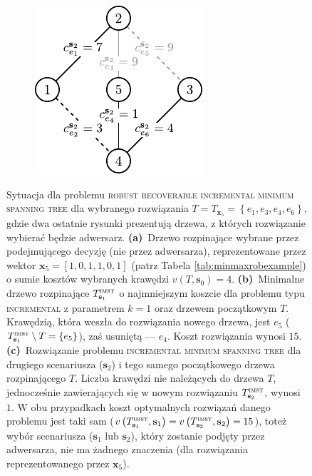 \begin{figure}[!htbp]
\begin{subfigure}[b]{0.3\textwidth}
		\caption{}
		\label{fig:robincrexample:b}
	\end{subfigure}
	\hfill
	\begin{subfigure}[b]{0.3\textwidth}
		\includegraphics[width=\textwidth]{Chapter_II/ROB-INC-MST-example/c1}
		\caption{}
		\label{fig:robincrexample:c}
	\end{subfigure}
	\hfill\null
	\caption{
		Sytuacja dla problemu \textsc{robust recoverable incremental minimum spanning tree} dla wybranego rozwiązania $T = T_{\textbf{x}_{5}} = \left\{ e_{1}, e_{3}, e_{4}, e_{6} \right\}$, gdzie dwa ostatnie rysunki prezentują drzewa, z których rozwiązanie wybierać będzie adwersarz.
		\textbf{(a)}~Drzewo rozpinające wybrane przez podejmującego decyzję (nie przez adwersarza), reprezentowane przez wektor $\textbf{x}_{5} = \left[ 1, 0, 1, 1, 0, 1 \right]$ (patrz Tabela \ref{tab:minmaxrobexample}) o sumie kosztów wybranych krawędzi $v \left( T, \textbf{s}_{0} \right) = 4$.
		\textbf{(b)}~Minimalne drzewo rozpinające $T^{\textsc{imst}}_{\textbf{s}_{1}}$ o najmniejszym koszcie dla problemu typu \textsc{incremental} z parametrem $k = 1$ oraz drzewem początkowym $T$. Krawędzią, która weszła do rozwiązania nowego drzewa, jest $e_{5}$ ($T^{\textsc{imst}}_{\textbf{s}_{1}} \setminus T = \left\{ e_{5} \right\}$), zaś usuniętą --- $e_{4}$. Koszt rozwiązania wynosi $15$.
		\textbf{(c)}~Rozwiązanie problemu \textsc{incremental minimum spanning tree} dla drugiego scenariusza ($\textbf{s}_{2}$) i tego samego początkowego drzewa rozpinającego $T$. Liczba krawędzi nie należących do drzewa $T$, jednocześnie zawierających się w nowym rozwiązaniu $T^{\textsc{imst}}_{\textbf{s}_{2}}$, wynosi $1$. W obu przypadkach koszt optymalnych rozwiązań danego problemu jest taki sam ($v \left(  T^{\textsc{imst}}_{\textbf{s}_{1}}, \textbf{s}_{1} \right) = v \left(  T^{\textsc{imst}}_{\textbf{s}_{2}}, \textbf{s}_{2} \right) = 15$), toteż wybór scenariusza ($\textbf{s}_{1}$ lub $\textbf{s}_{2}$), który zostanie podjęty przez adwersarza, nie ma żadnego znaczenia (dla rozwiązania reprezentowanego przez $\textbf{x}_{5}$).
}
\end{figure}
